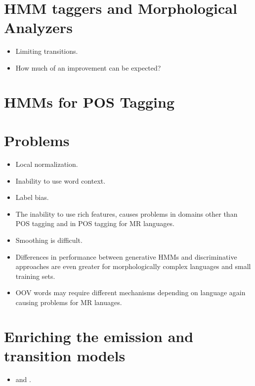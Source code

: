 \section{HMM taggers and Morphological Analyzers}
\begin{itemize}
\item Limiting transitions.
\item How much of an improvement can be expected?
\end{itemize}


\section{HMMs for POS Tagging}

\section{Problems}
\begin{itemize}
\item Local normalization.
\item Inability to use word context.
\item Label bias.
\item The inability to use rich features, causes problems in domains
  other than POS tagging and in POS tagging for MR languages.
\item Smoothing is difficult.
\item Differences in performance between generative HMMs and
  discriminative approaches are even greater for morphologically
  complex languages and small training sets.
\item OOV words may require different mechanisms depending on
  language again causing problems for MR lanuages.
\end{itemize}

\section{Enriching the emission and transition models}
\begin{itemize}
\item \cite{Halacsy2007} and \cite{Silfverberg2011}.
\end{itemize}
